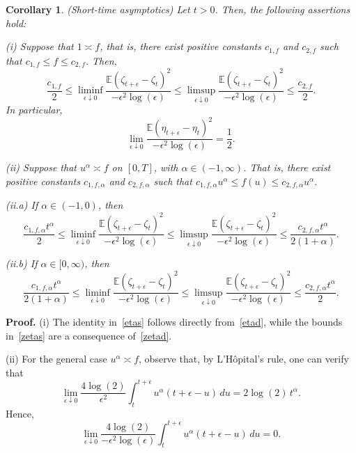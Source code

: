 \documentclass[preprint,12pt,authoryear]{elsarticle}
\def\E{\mathbb{E}}
\newtheorem{cor}{Corollary}
\begin{document}
\begin{cor}\label{corB}(Short-time asymptotics)
 Let \( t > 0 \). Then, the following assertions hold:

(i) Suppose that \( 1 \asymp f \), that is, there exist positive constants \( c_{1,f} \) and \( c_{2,f} \) such that \( c_{1,f} \leq f \leq c_{2,f} \). Then,
\begin{equation}\label{zetas}
\frac{c_{1,f}}{2} \leq \liminf_{\epsilon \downarrow 0} \frac{\E(\zeta_{t+\epsilon} - \zeta_{t})^2}{-\epsilon^2 \log(\epsilon)} \leq \limsup_{\epsilon \downarrow 0} \frac{\E(\zeta_{t+\epsilon} - \zeta_{t})^2}{-\epsilon^2 \log(\epsilon)} \leq \frac{c_{2,f}}{2}.
\end{equation}
In particular,
\begin{equation}\label{etas} 
\lim_{\epsilon \downarrow 0} \frac{\E(\eta_{t+\epsilon} - \eta_{t})^2}{-\epsilon^2 \log(\epsilon)} = \frac{1}{2}.
\end{equation}

(ii) Suppose that \( u^{\alpha} \asymp f \) on \([0,T]\), with \( \alpha \in (-1, \infty) \). That is, there exist positive constants \( c_{1,f,\alpha} \) and \( c_{2,f,\alpha} \) such that \( c_{1,f,\alpha} u^{\alpha} \leq f(u) \leq c_{2,f,\alpha} u^{\alpha} \).

(ii.a) If \( \alpha \in (-1,0) \), then
\begin{equation*}
\frac{c_{1,f,\alpha} t^{\alpha}}{2} \leq \liminf_{\epsilon \downarrow 0} \frac{\E(\zeta_{t+\epsilon} - \zeta_{t})^2}{-\epsilon^2 \log(\epsilon)} \leq \limsup_{\epsilon \downarrow 0} \frac{\E(\zeta_{t+\epsilon} - \zeta_{t})^2}{-\epsilon^2 \log(\epsilon)} \leq \frac{c_{2,f,\alpha} t^{\alpha}}{2(1 + \alpha)}.
\end{equation*}

(ii.b) If \( \alpha \in [0, \infty) \), then
\begin{equation*}
\frac{c_{1,f,\alpha} t^{\alpha}}{2(1 + \alpha)} \leq \liminf_{\epsilon \downarrow 0} \frac{\E(\zeta_{t+\epsilon} - \zeta_{t})^2}{-\epsilon^2 \log(\epsilon)} \leq \limsup_{\epsilon \downarrow 0} \frac{\E(\zeta_{t+\epsilon} - \zeta_{t})^2}{-\epsilon^2 \log(\epsilon)} \leq \frac{c_{2,f,\alpha} t^{\alpha}}{2}.
\end{equation*}
\end{cor}

\noindent\textbf{Proof.} (i) The identity in~\eqref{etas} follows directly from~\eqref{etad}, while the bounds in~\eqref{zetas} are a consequence of~\eqref{zetad}.

(ii) For the general case \( u^{\alpha} \asymp f \), observe that, by L’Hôpital’s rule, one can verify that
\[
\lim_{\epsilon \downarrow 0} \frac{4\log(2)}{\epsilon^2} \int_t^{t+\epsilon} u^{\alpha} (t+\epsilon - u) \, du = 2\log(2)\, t^{\alpha}.
\]
Hence,
\begin{equation}\label{lim_a}
\lim_{\epsilon \downarrow 0} \frac{4\log(2)}{-\epsilon^2 \log(\epsilon)} \int_t^{t+\epsilon} u^{\alpha} (t+\epsilon - u) \, du = 0.
\end{equation}
\end{document}
